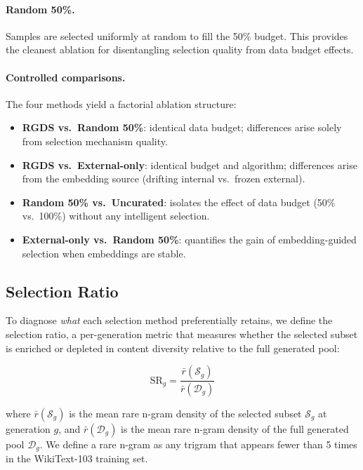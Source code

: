 \paragraph{Random 50\%.} Samples are selected uniformly at random to fill the 50\% budget. This provides the cleanest ablation for disentangling selection quality from data budget effects.

\paragraph{Controlled comparisons.} The four methods yield a factorial ablation structure:

\begin{itemize}
    \item \textbf{RGDS vs.\ Random 50\%}: identical data budget; differences arise solely from selection mechanism quality.
    \item \textbf{RGDS vs.\ External-only}: identical budget and algorithm; differences arise from the embedding source (drifting internal vs.\ frozen external).
    \item \textbf{Random 50\% vs.\ Uncurated}: isolates the effect of data budget (50\% vs.\ 100\%) without any intelligent selection.
    \item \textbf{External-only vs.\ Random 50\%}: quantifies the gain of embedding-guided selection when embeddings are stable.
\end{itemize}

\subsection{Selection Ratio}

To diagnose \emph{what} each selection method preferentially retains, we define the selection ratio, a per-generation metric that measures whether the selected subset is enriched or depleted in content diversity relative to the full generated pool:

\begin{equation}
    \text{SR}_g = \frac{\bar{r}(\mathcal{S}_g)}{\bar{r}(\mathcal{D}_g)}
\end{equation}

\noindent where $\bar{r}(\mathcal{S}_g)$ is the mean rare n-gram density of the selected subset $\mathcal{S}_g$ at generation $g$, and $\bar{r}(\mathcal{D}_g)$ is the mean rare n-gram density of the full generated pool $\mathcal{D}_g$. We define a rare n-gram as any trigram that appears fewer than 5 times in the WikiText-103 training set.

